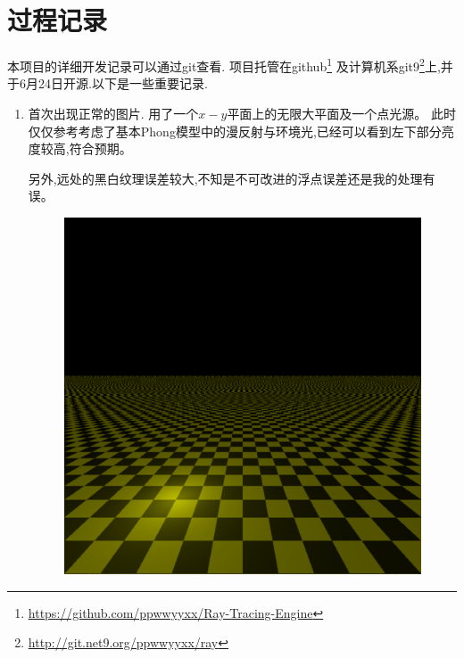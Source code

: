 \section{过程记录}
本项目的详细开发记录可以通过git查看. 项目托管在github\footnote{\url{https://github.com/ppwwyyxx/Ray-Tracing-Engine}}
及计算机系git9\footnote{\url{http://git.net9.org/ppwwyyxx/ray}}上,并于6月24日开源.以下是一些重要记录.

\begin{enumerate}
  \item
    首次出现正常的图片. 用了一个$ x-y$平面上的无限大平面及一个点光源。
    此时仅仅参考\cite{phong}考虑了基本Phong模型中的漫反射与环境光,已经可以看到左下部分亮度较高,符合预期。

    另外,远处的黑白纹理误差较大,不知是不可改进的浮点误差还是我的处理有误。
    \begin{figure}[H]
      \centering
      \includegraphics[scale=0.4]{img/first_pic.png}
      \caption{\label{fig:first}}
    \end{figure}


\end{enumerate}
